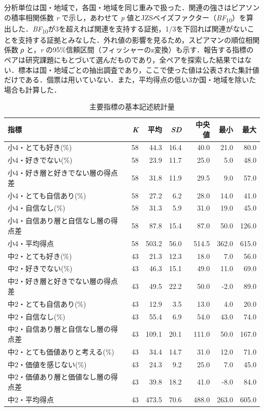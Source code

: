 \documentclass[a4paper,10pt,twocolumn]{ltjsarticle}
\begin{document}
分析単位は国・地域で，各国・地域を同じ重みで扱った．関連の強さはピアソンの積率相関係数 \textit{r} で示し，あわせて \textit{p} 値とJZSベイズファクター（\textit{BF}\textsubscript{10}）を算出した．\textit{BF}\textsubscript{10}が3を超えれば関連を支持する証拠，1/3を下回れば関連がないことを支持する証拠とみなした．外れ値の影響を見るため，スピアマンの順位相関係数 \textit{ρ} と，\textit{r} の95\%信頼区間（フィッシャーのz変換）も示す．報告する指標のペアは研究課題にもとづいて選んだものであり，全ペアを探索した結果ではない．標本は国・地域ごとの抽出調査であり，ここで使った値は公表された集計値だけである．個票は用いていない．また，平均得点の低い3か国・地域を除いた場合も計算した．
\begin{table}[!t]
\caption{主要指標の基本記述統計量}
\centering\small
\begin{tabular}{>{\raggedright\arraybackslash}p{9.2cm}rrrrrr}
\toprule
指標 & \textit{K} & 平均 & \textit{SD} & 中央値 & 最小 & 最大 \\
\midrule
小4・とても好き(\%) & 58 & 44.3 & 16.4 & 40.0 & 21.0 & 80.0 \\
小4・好きでない(\%) & 58 & 23.9 & 11.7 & 25.0 & 5.0 & 48.0 \\
小4・好き層と好きでない層の得点差 & 58 & 31.8 & 11.9 & 29.5 & 9.0 & 57.0 \\
小4・とても自信あり(\%) & 58 & 27.2 & 6.2 & 28.0 & 14.0 & 41.0 \\
小4・自信なし(\%) & 58 & 31.3 & 5.9 & 31.0 & 19.0 & 45.0 \\
小4・自信あり層と自信なし層の得点差 & 58 & 87.8 & 15.4 & 87.0 & 50.0 & 126.0 \\
小4・平均得点 & 58 & 503.2 & 56.0 & 514.5 & 362.0 & 615.0 \\
中2・とても好き(\%) & 43 & 21.3 & 12.3 & 18.0 & 7.0 & 56.0 \\
中2・好きでない(\%) & 43 & 46.3 & 15.1 & 49.0 & 11.0 & 69.0 \\
中2・好き層と好きでない層の得点差 & 43 & 49.5 & 22.2 & 50.0 & -2.0 & 89.0 \\
中2・とても自信あり(\%) & 43 & 12.9 & 3.5 & 13.0 & 4.0 & 20.0 \\
中2・自信なし(\%) & 43 & 55.4 & 6.9 & 54.0 & 43.0 & 74.0 \\
中2・自信あり層と自信なし層の得点差 & 43 & 109.1 & 20.1 & 111.0 & 50.0 & 167.0 \\
中2・とても価値ありと考える(\%) & 43 & 34.4 & 14.7 & 31.0 & 12.0 & 71.0 \\
中2・価値を感じない(\%) & 43 & 24.3 & 9.2 & 25.0 & 7.0 & 45.0 \\
中2・価値あり層と価値なし層の得点差 & 43 & 39.8 & 18.2 & 41.0 & -8.0 & 84.0 \\
中2・平均得点 & 43 & 473.5 & 70.6 & 488.0 & 263.0 & 605.0 \\
\bottomrule
\end{tabular}
\par{}
\end{table}
\end{document}
